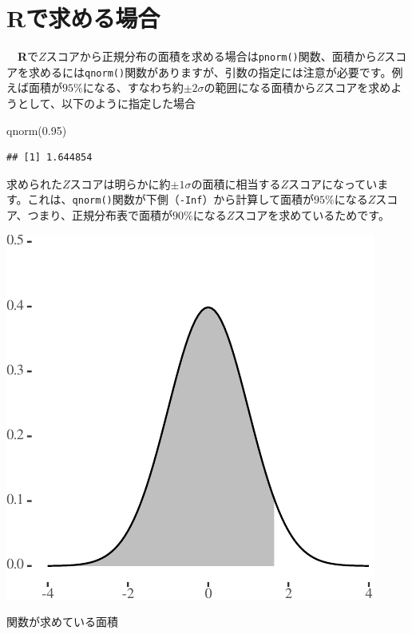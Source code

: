\documentclass[]{tufte-handout}
\newenvironment{Shaded}{}{}
\newcommand{\FloatTok}[1]{\textcolor[rgb]{0.25,0.63,0.44}{#1}}
\newcommand{\FunctionTok}[1]{\textcolor[rgb]{0.02,0.16,0.49}{#1}}
\newcommand{\NormalTok}[1]{#1}
\begin{document}
\hypertarget{rux3067ux6c42ux3081ux308bux5834ux5408}{%
\section{\texorpdfstring{\textbf{Rで求める場合}}{Rで求める場合}}\label{rux3067ux6c42ux3081ux308bux5834ux5408}}

　\textbf{R}で\(Z\)スコアから正規分布の面積を求める場合は\texttt{pnorm()}関数、面積から\(Z\)スコアを求めるには\texttt{qnorm()}関数がありますが、引数の指定には注意が必要です。例えば面積が\(95\%\)になる、すなわち約\(\pm2\sigma\)の範囲になる面積から\(Z\)スコアを求めようとして、以下のように指定した場合

\begin{Shaded}
\begin{Highlighting}[numbers=left,,]
\FunctionTok{qnorm}\NormalTok{(}\FloatTok{0.95}\NormalTok{)}
\end{Highlighting}
\end{Shaded}

\begin{verbatim}
## [1] 1.644854
\end{verbatim}

求められた\(Z\)スコアは明らかに約\(\pm1\sigma\)の面積に相当する\(Z\)スコアになっています。これは、\texttt{qnorm()}関数が下側（\texttt{-Inf}）から計算して面積が\(95\%\)になる\(Z\)スコア、つまり、正規分布表で面積が\(90\%\)になる\(Z\)スコアを求めているためです。

\begin{marginfigure}

{\centering \includegraphics{NormTable_files/figure-latex/unnamed-chunk-3-1} 

}

\caption[関数が求めている面積]{関数が求めている面積}\label{fig:unnamed-chunk-3}
\end{marginfigure}
\end{document}
